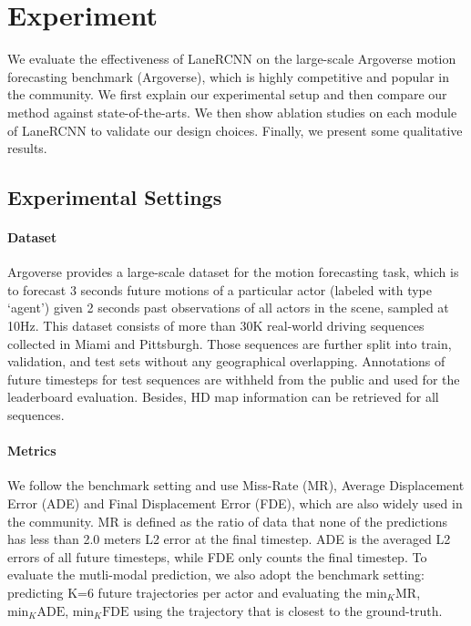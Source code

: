 \section{Experiment}

We evaluate the effectiveness of LaneRCNN on the large-scale Argoverse motion
forecasting benchmark (Argoverse), which is highly competitive and popular in
the community.
We first
explain our experimental setup and then compare our method against
state-of-the-arts. We then show ablation studies on each
module of LaneRCNN to validate our design choices. Finally, we present some
qualitative results.

\subsection{Experimental Settings}
\paragraph{Dataset}
Argoverse provides a large-scale dataset \cite{argoverse} for the
motion forecasting task, which is to
forecast 3 seconds future motions of a particular actor (labeled with type
`agent') given 2 seconds past observations of all
actors in the scene, sampled at 10Hz. 
This dataset consists of more than 30K real-world driving sequences collected in Miami and Pittsburgh.
Those sequences are further split into train, validation, and test sets without
any geographical overlapping. 
Annotations of future timesteps for test sequences are withheld from the public and used for
the leaderboard evaluation. Besides, HD map information can be retrieved for all
sequences. 

\paragraph{Metrics} We follow the benchmark setting and use Miss-Rate (MR), Average
Displacement Error (ADE) and Final Displacement Error (FDE), which are also
widely used in the community. MR is defined as the ratio of data that none of
the predictions has less than 2.0 meters L2 error at the final timestep. ADE is
the averaged L2 errors of all future timesteps, while FDE only
counts the final timestep. To evaluate the mutli-modal prediction, we
also adopt the benchmark setting: predicting K=6 future trajectories
per actor and evaluating the $\text{min}_{K}\text{MR}$, $\text{min}_{K}\text{ADE}$,
$\text{min}_{K}\text{FDE}$ using the trajectory that is closest to the
ground-truth.


